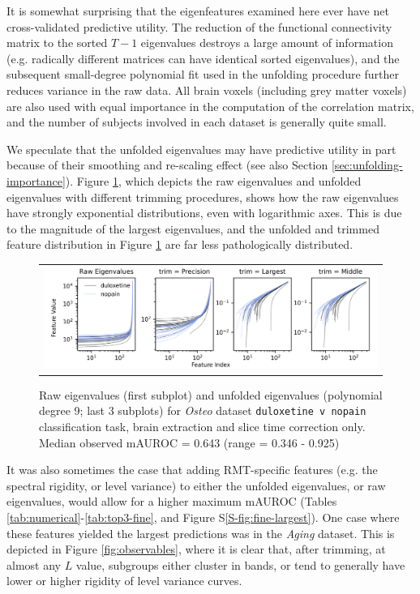 \documentclass[12pt]{spieman}  %
\begin{document}
\begin{spacing}{2}
It is somewhat surprising that the eigenfeatures examined here ever have net
cross-validated predictive utility. The reduction of the functional
connectivity matrix to the sorted \(T - 1\) eigenvalues destroys a large amount
of information (e.g. radically different matrices can have identical sorted
eigenvalues), and the subsequent small-degree polynomial fit used in the
unfolding procedure further reduces variance in the raw data.  All brain voxels
(including grey matter voxels) are also used with equal importance in the
computation of the correlation matrix, and the number of subjects involved in
each dataset is generally quite small.

We speculate that the unfolded eigenvalues may have predictive utility in part
because of their smoothing and re-scaling effect (see also Section
\ref{sec:unfolding-importance}). Figure \ref{fig:unfolded}, which depicts the
raw eigenvalues and unfolded eigenvalues with different trimming procedures,
shows how the raw eigenvalues have strongly exponential distributions, even
with logarithmic axes. This is due to the magnitude of the largest eigenvalues,
and the unfolded and trimmed feature distribution in Figure \ref{fig:unfolded}
are far less pathologically distributed.

\begin{figure}
\begin{center}
\begin{tabular}{c}
\includegraphics[width=6.5in]{unfolded_osteo_duloxetine_v_nopain.png}
\end{tabular}
\end{center}
\caption
{ \label{fig:unfolded} Raw eigenvalues (first subplot) and unfolded eigenvalues
(polynomial degree 9; last 3 subplots) for \textit{Osteo} dataset
\footnotesize\texttt{duloxetine v nopain} classification task, brain extraction
and slice time correction only. Median observed mAUROC = 0.643 (range = 0.346 -
0.925)}
\end{figure}

It was also sometimes the case that adding RMT-specific features (e.g. the spectral
rigidity, or level variance) to either the unfolded eigenvalues, or raw
eigenvalues, would allow for a higher maximum mAUROC (Tables
\ref{tab:numerical}-\ref{tab:top3-fine}, and Figure S\ref{S-fig:fine-largest}). One case where these
features yielded the largest predictions was in the \textit{Aging} dataset.
This is depicted in Figure \ref{fig:observables}, where it is clear that, after
trimming, at almost any \(L\) value, subgroups either cluster in bands, or tend to
generally have lower or higher rigidity of level variance curves.


\end{spacing}
\end{document}
